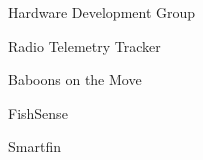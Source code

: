 \item Hardware Development Group
\item Radio Telemetry Tracker
\item Baboons on the Move
\item FishSense
\item Smartfin

